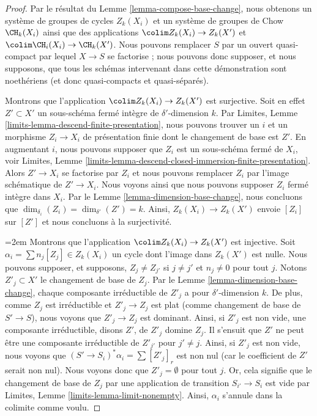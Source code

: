 \begin{proof}
Par le résultat du Lemme \ref{lemma-compose-base-change}, nous obtenons
un système de groupes de cycles $Z_k(X_i)$ et un système de
groupes de Chow $\CH_k(X_i)$ ainsi que des applications
$\colim Z_k(X_i) \to Z_k(X')$ et $\colim \CH_i(X_i) \to \CH_k(X')$.
Nous pouvons remplacer $S$ par un ouvert quasi-compact par lequel $X \to S$
se factorise ; nous pouvons donc supposer, et nous supposons, que tous les schémas intervenant dans
cette démonstration sont noethériens (et donc quasi-compacts et quasi-séparés).

\medskip\noindent
Montrons que l'application $\colim Z_k(X_i) \to Z_k(X')$ est surjective.
Soit en effet $Z' \subset X'$
un sous-schéma fermé intègre de $\delta'$-dimension $k$. Par
Limites, Lemme \ref{limits-lemma-descend-finite-presentation},
nous pouvons trouver un $i$ et un morphisme $Z_i \to X_i$ de présentation finie
dont le changement de base est $Z'$. En augmentant $i$, nous pouvons supposer que $Z_i$
est un sous-schéma fermé de $X_i$, voir
Limites, Lemme \ref{limits-lemma-descend-closed-immersion-finite-presentation}.
Alors $Z' \to X_i$ se factorise par $Z_i$ et nous pouvons remplacer $Z_i$
par l'image schématique de $Z' \to X_i$. Nous voyons ainsi
que nous pouvons supposer $Z_i$ fermé intègre dans $X_i$.
Par le Lemme \ref{lemma-dimension-base-change}, nous concluons que
$\dim_{\delta_i}(Z_i) = \dim_{\delta'}(Z') = k$.
Ainsi, $Z_k(X_i) \to Z_k(X')$ envoie $[Z_i]$ sur $[Z']$ et
nous concluons à la surjectivité.

{\emergencystretch=2em\medskip\noindent
Montrons que l'application $\colim Z_k(X_i) \to Z_k(X')$ est injective.
Soit $\alpha_i = \sum n_j[Z_j] \in Z_k(X_i)$ un cycle dont l'image
dans $Z_k(X')$ est nulle. Nous pouvons supposer, et supposons, $Z_j \not = Z_{j'}$ si
$j \not = j'$ et $n_j \not = 0$ pour tout $j$.
Notons $Z'_j \subset X'$ le changement de base de $Z_j$.
Par le Lemme \ref{lemma-dimension-base-change}, chaque composante irréductible
de $Z'_j$ a pour $\delta'$-dimension $k$. De plus, comme $Z_j$ est irréductible
et $Z'_j \to Z_j$ est plat (comme changement de base de $S' \to S$),
nous voyons que $Z'_j \to Z_j$ est dominant.
Ainsi, si $Z'_j$ est non vide, une composante irréductible, disons
$Z'$, de $Z'_j$ domine $Z_j$. Il s'ensuit que $Z'$
ne peut être une composante irréductible de $Z'_{j'}$ pour $j' \not = j$.
Ainsi, si $Z'_j$ est non vide, nous voyons que $(S' \to S_i)^*\alpha_i
= \sum [Z'_j]_r$ est non nul (car le coefficient de $Z'$ serait non nul).
Nous voyons donc que $Z'_j = \emptyset$ pour tout $j$. Or, cela signifie
que le changement de base de $Z_j$ par une application de transition $S_{i'} \to S_i$
est vide par Limites, Lemme \ref{limits-lemma-limit-nonempty}.
Ainsi, $\alpha_i$ s'annule dans la colimite comme voulu.\par}


\end{proof}

